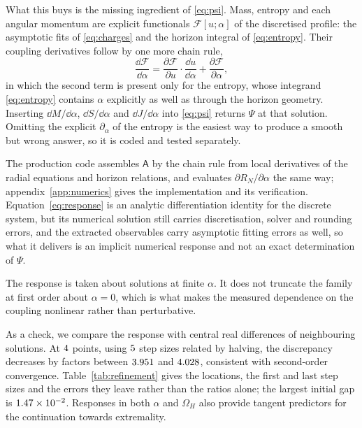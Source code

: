 \documentclass[11pt,a4paper]{article}
\begin{document}
What this buys is the missing ingredient of \eqref{eq:psi}. Mass, entropy and
each angular momentum are explicit functionals $\mathcal F[u;\alpha]$ of the
discretised profile: the asymptotic fits of \eqref{eq:charges} and the horizon
integral of \eqref{eq:entropy}. Their coupling derivatives follow by one more
chain rule,
\begin{equation*}
 \frac{\dd\mathcal F}{\dd\alpha}
 =\frac{\partial\mathcal F}{\partial u}\cdot\frac{\dd u}{\dd\alpha}
 +\frac{\partial\mathcal F}{\partial\alpha},
\end{equation*}
in which the second term is present only for the entropy, whose integrand
\eqref{eq:entropy} contains $\alpha$ explicitly as well as through the horizon
geometry. Inserting $\dd M/\dd\alpha$, $\dd S/\dd\alpha$ and $\dd J/\dd\alpha$
into \eqref{eq:psi} returns $\Psi$ at that solution. Omitting the explicit
$\partial_\alpha$ of the entropy is the easiest way to produce a smooth but
wrong answer, so it is coded and tested separately.

The production code assembles $\mathsf A$ by the chain rule from local
derivatives of the radial equations and horizon relations, and evaluates
$\partial R_N/\partial\alpha$ the same way; appendix~\ref{app:numerics} gives
the implementation and its verification. Equation~\eqref{eq:response} is an
analytic differentiation identity for the discrete system, but its numerical
solution still carries discretisation, solver and rounding errors, and the
extracted observables carry asymptotic fitting errors as well, so what it
delivers is an implicit numerical response and not an exact determination
of $\Psi$.

The response is taken about solutions at finite $\alpha$. It does not truncate
the family at first order about $\alpha=0$, which is what makes the measured
dependence on the coupling nonlinear rather than perturbative.

As a check, we compare the response with central real differences of
neighbouring solutions. At $4$ points, using
$5$ step sizes related by halving, the discrepancy
decreases by factors between $3.951$ and $4.028$, consistent
with second-order convergence. Table~\ref{tab:refinement} gives the locations,
the first and last step sizes and the errors they leave rather than the ratios
alone; the largest initial gap is $1.47\times 10^{-2}$.
Responses in both $\alpha$ and $\Omega_H$ also provide tangent predictors
for the continuation towards extremality.
\end{document}
